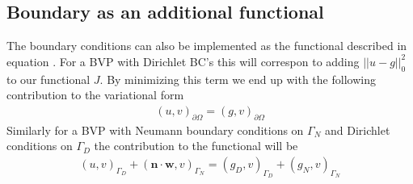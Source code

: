 \subsection{Boundary as an additional functional}
The boundary conditions can also be implemented as the functional described in equation . For a BVP with Dirichlet BC's this will correspon to adding $||u-g||^2_0$ to our functional $J$. By minimizing this term we end up with the following contribution to the variational form
\begin{align}
	(u,v)_{\partial \Omega}=(g,v)_{\partial \Omega}
	\label{eq:BCFunctionalImplementationContribution}
\end{align}
Similarly for a BVP with Neumann boundary conditions on $\Gamma_N$ and Dirichlet conditions on $\Gamma_D$ the contribution to the functional will be
\begin{align}
	(u,v)_{\Gamma_D} + (\mathbf{n}\cdot \mathbf{w},v)_{\Gamma_N}=
	(g_D,v)_{\Gamma_D} + (g_N,v)_{\Gamma_N} 
	\label{eq:NeuDirFunctional}
\end{align}
